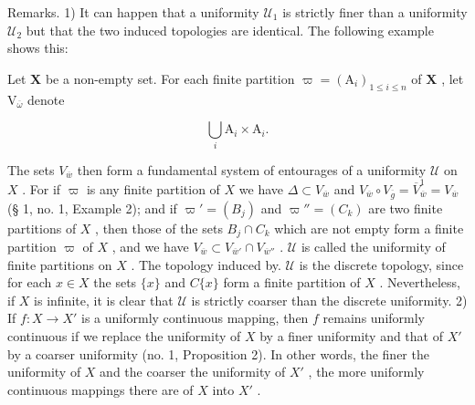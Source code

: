 Remarks. 1) It can happen that a uniformity \(\mathcal{U}_1\) is strictly finer than a uniformity \(\mathcal{U}_2\) but that the two induced topologies are identical. The following example shows this:

Let \(\mathbf{X}\) be a non-empty set. For each finite partition \(\varpi = (\mathrm{A}_i)_{1\leqslant i\leqslant n}\) of \(\mathbf{X}\) , let \(\mathrm{V}_{\overline{\omega}}\) denote

\[
\bigcup_ {i} \mathrm{A} _ {i} \times \mathrm{A} _ {i}.
\]

The sets \(V_{\overline{w}}\) then form a fundamental system of entourages of a uniformity \(\mathcal{U}\) on \(X\) . For if \(\varpi\) is any finite partition of \(X\) we have \(\Delta \subset V_{\overline{w}}\) and \(V_{\overline{w}} \circ V_{\overline{g}} = \overline{V}_{\overline{w}}^{1} = V_{\overline{w}}\) (§ 1, no. 1, Example 2); and if \(\varpi' = (B_j)\) and \(\varpi'' = (C_k)\) are two finite partitions of \(X\) , then those of the sets \(B_j \cap C_k\) which are not empty form a finite partition \(\varpi\) of \(X\) , and we have \(V_{\overline{w}} \subset V_{\overline{w}'} \cap V_{\overline{w}''}\) . \(\mathcal{U}\) is called the uniformity of finite partitions on \(X\) . The topology induced by. \(\mathcal{U}\) is the discrete topology, since for each \(x \in X\) the sets \(\{x\}\) and \(C\{x\}\) form a finite partition of \(X\) . Nevertheless, if \(X\) is infinite, it is clear that \(\mathcal{U}\) is strictly coarser than the discrete uniformity. 2) If \(f: X \to X'\) is a uniformly continuous mapping, then \(f\) remains uniformly continuous if we replace the uniformity of \(X\) by a finer uniformity and that of \(X'\) by a coarser uniformity (no. 1, Proposition 2). In other words, the finer the uniformity of \(X\) and the coarser the uniformity of \(X'\) , the more uniformly continuous mappings there are of \(X\) into \(X'\) .

